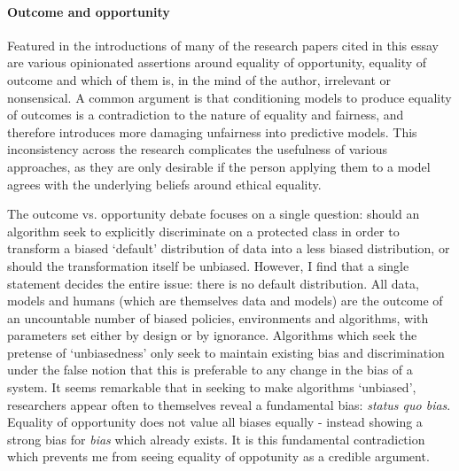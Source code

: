 \documentclass[conference]{IEEEtran}
\begin{document}
\paragraph{Outcome and opportunity}
Featured in the introductions of many of the research papers cited in this essay are various opinionated assertions around equality of opportunity, equality of outcome and which of them is, in the mind of the author, irrelevant or nonsensical. A common argument is that conditioning models to produce equality of outcomes is a contradiction to the nature of equality and fairness, and therefore introduces more damaging unfairness into predictive models. This inconsistency across the research complicates the usefulness of various approaches, as they are only desirable if the person applying them to a model agrees with the underlying beliefs around ethical equality.

The outcome vs. opportunity debate focuses on a single question: should an algorithm seek to explicitly discriminate on a protected class in order to transform a biased `default' distribution of data into a less biased distribution, or should the transformation itself be unbiased. However, I find that a single statement decides the entire issue: there is no default distribution. All data, models and humans (which are themselves data and models) are the outcome of an uncountable number of biased policies, environments and algorithms, with parameters set either by design or by ignorance. Algorithms which seek the pretense of `unbiasedness' only seek to maintain existing bias and discrimination under the false notion that this is preferable to any change in the bias of a system. It seems remarkable that in seeking to make algorithms `unbiased', researchers appear often to themselves reveal a fundamental bias: \emph{status quo bias}. Equality of opportunity does not value all biases equally - instead showing a strong bias for \emph{bias} which already exists. It is this fundamental contradiction which prevents me from seeing equality of oppotunity as a credible argument. 
\pagebreak


\end{document}
